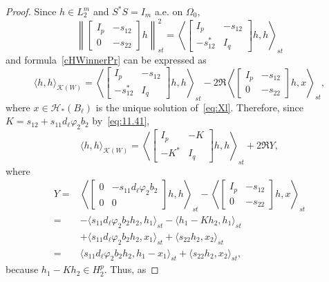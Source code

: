 \documentclass[12pt,twoside,a4paper]{amsart}
\theoremstyle{definition}
\numberwithin{equation}{section}
\begin{document}
\begin{proof}
Since $h\in L_2^m$ and $S^*S=I_m$ a.e. on $\Omega_0$,
\[
\left\| \left[\begin{array}{cc}
  I_p   &   -s_{12}\\
   0 &-s_{22}  \end{array}  \right]h
   \right\|^2_{st}=\left\langle \left[\begin{array}{cc}
  I_p   &   -s_{12}\\
  -s_{12}^* &   I_q
\end{array}  \right]h,h
\right\rangle_{st}
\]
and  formula~\eqref{cHWinnerPr} can be expressed as
\[
\langle h,h \rangle_{{{\mathcal K}}(W)}=\left\langle \left[\begin{array}{cc}
  I_p   &   -s_{12}\\
  -s_{12}^* &   I_q
\end{array}  \right]h,h
\right\rangle_{st} -2\Re\left\langle \left[\begin{array}{cc}
  I_p   &   -s_{12}\\
   0 &-s_{22}  \end{array}  \right]h
 ,x
\right\rangle_{st} ,
\]
where $x\in{{\mathcal H}}_*(B_\ell)$ is the unique solution of~\eqref{eq:Xl}.
Therefore, since $K=s_{12}+s_{11}d_\ell \varphi_2b_2$ by~\eqref{eq:11.41},
\[
\langle h,h \rangle_{{{\mathcal K}}(W)}=\left\langle \left[\begin{array}{cc}
  I_p   &   -K\\
  -K^* &   I_q
\end{array}  \right]h,h
\right\rangle_{st} +2\Re Y,
\]
where
\[
\begin{split}
Y=&\left\langle \left[\begin{array}{cc}
  0   &   -s_{11}d_\ell\varphi_2b_2\\
  0   &   0
\end{array}  \right]h,h
\right\rangle_{st} -\left\langle \left[\begin{array}{cc}
  I_p   &   -s_{12}\\
   0    &   -s_{22}  \end{array}  \right]h
 ,x
\right\rangle_{st} \\
=&-\langle s_{11}d_\ell\varphi_2b_2h_2, h_1 \rangle_{st} -\langle h_1-Kh_2, h_1
\rangle_{st}\\
&+\langle s_{11}d_\ell\varphi_2b_2h_2, x_1 \rangle_{st} +\langle
s_{22}h_2, x_2
\rangle_{st}\\
=&\langle s_{11}d_\ell\varphi_2b_2h_2, h_1- x_1 \rangle_{st} +\langle
s_{22}h_2, x_2 \rangle_{st},
\end{split}
\]
because $h_1-Kh_2\in H_2^p$. Thus, as

\end{proof}
\end{document}
